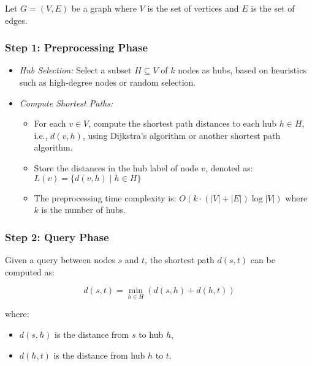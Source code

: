 				Let $ G = (V, E) $ be a graph where $ V $ is the set of vertices and $ E $ is the set of edges.
				
			\subsubsection{Step 1: Preprocessing Phase}
				\begin{itemize}
					\item \textit{Hub Selection:}  
					Select a subset \( H \subseteq V \) of \( k \) nodes as hubs, based on heuristics such as high-degree nodes or random selection.
				
					\item \textit{Compute Shortest Paths:}  
						\begin{itemize}
						
						\item For each $ v \in V $, compute the shortest path distances to each hub $ h \in H $, i.e., $ d(v, h) $, using Dijkstra’s algorithm or another shortest path algorithm.  
						
						\item Store the distances in the hub label of node $ v $, denoted as:
						$
						L(v) = \{ d(v, h) \mid h \in H \}
						$
						
						\item The preprocessing time complexity is:
						$
						O(k \cdot (|V| + |E|) \log |V|)
						$
						where $ k $ is the number of hubs.
						
						\end{itemize}
					\end{itemize}
			\subsubsection{Step 2: Query Phase}
				
				Given a query between nodes $ s $ and $ t $, the shortest path $ d(s, t) $ can be computed as:
				
						\begin{equation}
							d(s,t) = \min_{h \in H} \left( d(s,h) + d(h,t) \right)
						\end{equation}


				where:
				
				\begin{itemize}
					\item $ d(s, h) $ is the distance from $ s $ to hub $ h $,
					\item $ d(h, t) $ is the distance from hub $ h $ to $ t $.
				\end{itemize}
				
